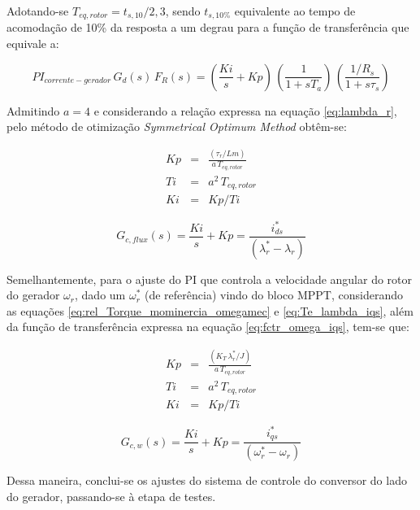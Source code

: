 Adotando-se $T_{eq,rotor} = t_{s,10}/2,3$, sendo $t_{s,10\%}$ equivalente ao tempo de acomodação de 10\% da resposta a um degrau para a função de transferência que equivale a:

\begin{equation}
\label{eq:tf_cl_inner_ger}
  PI_{corrente-gerador}\,G_{d}(s)\,F_R(s) = \left( \frac{Ki}{s} + Kp \right)\,\left(\frac{1}{1 + sT_a} \right)\,\left(\frac{1/R_s}{1 + s\tau_s}\right)
\end{equation}

Admitindo $a = 4$ e considerando a relação expressa na equação \ref{eq:lambda_r}, pelo método de otimização \textit{Symmetrical Optimum Method} obtêm-se:

\begin{eqnarray}
  Kp &=& \frac{(\tau_r/Lm)}{a\,T_{eq,rotor}}
  \\
  Ti &=& a^2\,T_{eq,rotor}
  \\
  Ki &=& Kp/Ti
\end{eqnarray}

\begin{equation}
\label{eq:PI_fluxo_rotor}
  G_{c,flux}(s) = \frac{Ki}{s} + Kp = \frac{i_{ds}^*}{(\lambda_{r}^*-\lambda_{r})}
\end{equation}


Semelhantemente, para o ajuste do PI que controla a velocidade angular do rotor do gerador $\omega_r$, dado um $\omega_r^*$ (de referência) vindo do bloco \ac{MPPT}, considerando as equações \ref{eq:rel_Torque_mominercia_omegamec} e \ref{eq:Te_lambda_iqs}, além da função de transferência expressa na equação \ref{eq:fctr_omega_iqs}, tem-se que:

\begin{eqnarray}
  Kp &=& \frac{(K_T\,\lambda_r^*/J)}{a\,T_{eq,rotor}}
  \\
  Ti &=& a^2\,T_{eq,rotor}
  \\
  Ki &=& Kp/Ti
\end{eqnarray}

\begin{equation}
\label{eq:PI_velocidade}
  G_{c,w}(s) = \frac{Ki}{s} + Kp = \frac{i_{qs}^*}{(\omega_r^*-\omega_r)}
\end{equation}


Dessa maneira, conclui-se os ajustes do sistema de controle do conversor do lado do gerador, passando-se à etapa de testes.



